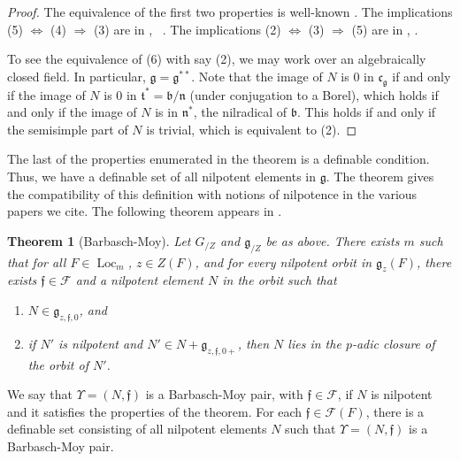 \documentclass[12pt]{amsart}
\newcommand\blue[1]{{\color{blue}{#1}}}
\newcommand{\op}[1]{\operatorname{#1}}
\def\Y{\Upsilon}
\def\s{{\mathfrak{f}}}
\newcommand{\cF}{\mathcal{F}}
\newcommand{\fg}{\mathfrak{g}}
\newcommand{\fb}{\mathfrak{b}}
\newcommand{\fn}{\mathfrak{n}}
\newcommand{\fc}{\mathfrak{c}}
\newcommand{\ft}{\mathfrak{t}}
\theoremstyle{plain}
\newtheorem{theorem}[thm]{Theorem}
\theoremstyle{definition}
\begin{document}
\begin{proof} \blue{All the implications mentioned in this proof should be understood as implications for the residual characteristic $p$ sufficiently large, with effective bound that depends only on the absolute root datum of $G$ (such bounds are stated in the sources we cite).} The equivalence of the first two properties is
  well-known \cite[15.3]{humphreys1975linear}.  The implications (5)
  $\Leftrightarrow$ (4) $\Rightarrow$ (3) are in \cite{debacker:nilp},
  ~\cite[2.5.1]{adler-debacker:bt-lie}.  The implications (2)
  $\Leftrightarrow$ (3) $\Rightarrow$ (5) are in \cite[3.5]{mcninch},
  \cite[4.1,Prop. 4 and Theorem 26]{mcninch}.

  To see the equivalence of (6) with say (2), we may work over an
  algebraically closed field. In particular, $\fg = \fg^{**}$.  Note
  that the image of $N$ is $0$ in $\fc_{\fg}$ if and only if the image
  of $N$ is $0$ in $\ft^* = \fb/\fn$ (under conjugation to a Borel),
  which holds if and only if the image of $N$ is in $\fn^*$, the
  nilradical of $\fb$.  This holds if and only if the semisimple part
  of $N$ is trivial, which is equivalent to (2).
\end{proof}

The last of the properties enumerated in the theorem is a definable
condition.  Thus, we have a definable set of all nilpotent elements in
$\fg$.  The theorem gives the compatibility of this definition with
notions of nilpotence in the various papers we cite.  The following
theorem appears in \cite{barbasch-moy}.

\begin{theorem}[Barbasch-Moy]\label{thm:bm} 
  Let $G_{/Z}$ and $\fg_{/Z}$ be as above.  There exists $m$ such that
  for all $F\in \op{Loc}_m$, $z\in Z(F)$, and for every nilpotent
  orbit in $\fg_z(F)$, there exists $\s\in \cF$ and a nilpotent
  element $N$ in the orbit such that
\begin{enumerate}
   \item $N\in \fg_{z,\s,0}$, and
   \item if $N'$ is nilpotent and $N'\in N + \fg_{z,\s,0+}$, then $N$
     lies in the $p$-adic closure of the orbit of $N'$.
\end{enumerate}
\end{theorem}

We say that $\Y=(N,\s)$ is a Barbasch-Moy pair, with $\s\in \cF$, if $N$
is nilpotent and it satisfies the properties of the theorem.  For each
$\s\in \cF(F)$, there is a definable set consisting of all nilpotent
elements $N$ such that $\Y=(N,\s)$ is a
Barbasch-Moy pair.
\end{document}
